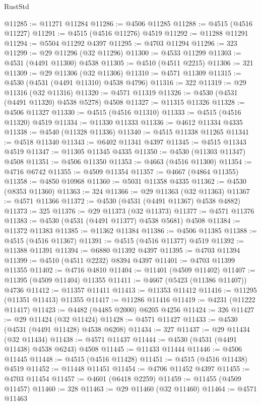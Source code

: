 \begin{lexlean}{RustStd}
\begin{coremodule}
{\begin{coremodule}
{{{{{{{{{{{{{{{{{{{{{{{{{{{{{{{{{{{{{{{{{{{{{{{{{{{{{{{@11285 := @11271 @11284
@11286 := @4506 @11285
@11288 := @4515 (@4516 @11227)
@11291 := @4515 (@4516 @11276) @4519
@11292 := @11288 @11291
@11294 := @5504 @11292 @4397
@11295 := @4703 @11294
@11296 := 323
@11299 := @29 @11296 (@32 @11296)
@11300 := @4533 @11299
@11303 := @4531 (@4491 @11300) @4538
@11305 := @4510 (@4511 @2215)
@11306 := 321
@11309 := @29 @11306 (@32 @11306)
@11310 := @4571 @11309
@11315 := @4530 (@4531 (@4491 @11310) @4538 @4796)
@11316 := 322
@11319 := @29 @11316 (@32 @11316)
@11320 := @4571 @11319
@11326 := @4530 (@4531 (@4491 @11320) @4538 @5278) @4508
@11327 := @11315 @11326
@11328 := @4506 @11327
@11330 := @4515 (@4516 @11310)
@11333 := @4515 (@4516 @11320) @4519
@11334 := @11330 @11333
@11336 := @4612 @11334 @4335
@11338 := @4540 (@11328 @11336)
@11340 := @4515 @11338 @11265
@11341 := @4518 @11340
@11343 := @6402 @11341 @4397
@11345 := @4515 @11343 @4519
@11347 := @11305 @11345 @4335
@11350 := @4530 (@11303 @11347) @4508
@11351 := @4506 @11350
@11353 := @4663 (@4516 @11300)
@11354 := @4716 @6742
@11355 := @4509 @11354
@11357 := @4667 (@4864 @11355)
@11358 := @4850 @10968
@11360 := @5031 @11358 @4335
@11362 := @4530 (@8353 @11360)
@11363 := 324
@11366 := @29 @11363 (@32 @11363)
@11367 := @4571 @11366
@11372 := @4530 (@4531 (@4491 @11367) @4538 @4882)
@11373 := 325
@11376 := @29 @11373 (@32 @11373)
@11377 := @4571 @11376
@11383 := @4530 (@4531 (@4491 @11377) @4538 @5681) @4508
@11384 := @11372 @11383
@11385 := @11362 @11384
@11386 := @4506 @11385
@11388 := @4515 (@4516 @11367)
@11391 := @4515 (@4516 @11377) @4519
@11392 := @11388 @11391
@11394 := @6880 @11392 @4397
@11395 := @4703 @11394
@11399 := @4510 (@4511 @2232) @8394 @4397
@11401 := @4703 @11399 @11355
@11402 := @4716 @4810
@11404 := @11401 (@4509 @11402)
@11407 := @11395 (@4509 @11404) @11355
@11411 := @4667 (@5423 (@11386 @11407)) @4736
@11412 := @11357 @11411
@11413 := @11353 @11412
@11416 := @11295 (@11351 @11413) @11355
@11417 := @11286 @11416
@11419 := @4231 (@11222 @11417)
@11423 := @4482 (@4485 @2000) @6205 @4256
@11424 := 326
@11427 := @29 @11424 (@32 @11424)
@11428 := @4571 @11427
@11433 := @4530 (@4531 (@4491 @11428) @4538 @6208)
@11434 := 327
@11437 := @29 @11434 (@32 @11434)
@11438 := @4571 @11437
@11444 := @4530 (@4531 (@4491 @11438) @4538 @6243) @4508
@11445 := @11433 @11444
@11446 := @4506 @11445
@11448 := @4515 (@4516 @11428)
@11451 := @4515 (@4516 @11438) @4519
@11452 := @11448 @11451
@11454 := @4706 @11452 @4397
@11455 := @4703 @11454
@11457 := @4601 (@6418 @2259)
@11459 := @11455 (@4509 @11457)
@11460 := 328
@11463 := @29 @11460 (@32 @11460)
@11464 := @4571 @11463
}}}}}}}}}}}}}}}}}}}}}}}}}}}}}}}}}}}}}}}}}}}}}}}}}}}}}}}
\end{coremodule}}
\end{coremodule}
\end{lexlean}

